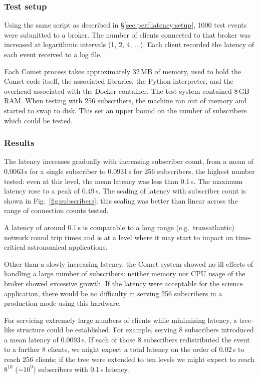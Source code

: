 \documentclass[5p,authoryear]{elsarticle}
\begin{document}
\subsubsection{Test setup}

Using the same script as described in \S\ref{sec:perf:latency:setup}, 1000
test events were submitted to a broker. The number of clients connected to
that broker was increased at logarithmic intervals (1, 2, 4, ...). Each client
recorded the latency of each event received to a log file.

Each Comet process takes approximately 32\,MB of memory, used to hold the
Comet code itself, the associated libraries, the Python interpreter, and the
overhead associated with the Docker container. The test system contained 8\,GB
RAM\@. When testing with 256 subscribers, the machine ran out of memory and
started to swap to disk. This set an upper bound on the number of subscribers
which could be tested.

\subsubsection{Results}

The latency increases gradually with increasing subscriber count, from a mean
of 0.0063\,s for a single subscriber to 0.0931\,s for 256 subscribers, the
highest number tested: even at this level, the mean latency was less than
0.1\,s. The maximum latency rose to a peak of 0.49\,s.  The scaling of latency
with subscriber count is shown in Fig.~\ref{fig:subscribers}; this scaling was
better than linear across the range of connection counts tested.

A latency of around 0.1\,s is comparable to a long range (e.g.\ transatlantic)
network round trip times and is at a level where it may start to impact on
time-critical astronomical applications.

Other than a slowly increasing latency, the Comet system showed no
ill effects of handling a large number of subscribers: neither memory nor CPU
usage of the broker showed excessive growth. If the latency were acceptable
for the science application, there would be no difficulty in serving 256
subscribers in a production mode using this hardware.

For servicing extremely large numbers of clients while minimizing latency, a
tree-like structure could be established. For example, serving 8 subscribers
introduced a mean latency of 0.0093\,s. If each of those 8 subscribers
redistributed the event to a further 8 clients, we might expect a total
latency on the order of 0.02\,s to reach 256 clients; if the tree were
extended to ten levels we might expect to reach $8^{10}$ ($\sim10^9$)
subscribers with 0.1\,s latency.
\end{document}
